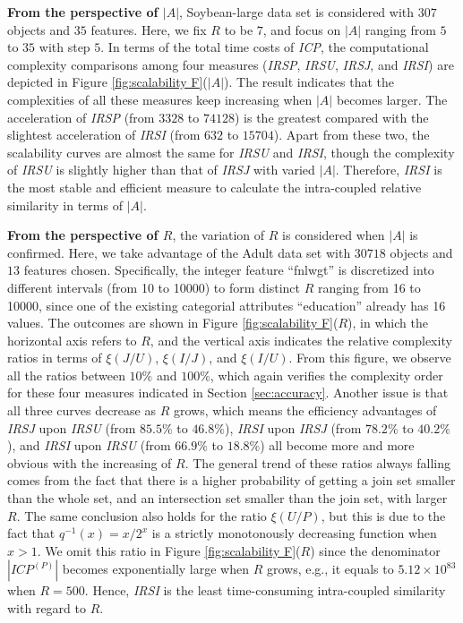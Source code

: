 \documentclass{article}
\numberwithin{equation}{section}
\begin{document}
\textbf{From the perspective of $|A|$}, Soybean-large data set is considered with $307$ objects and $35$ features. Here, we fix $R$ to be $7$, and focus on $|A|$ ranging from $5$ to $35$ with step $5$. In terms of the total time costs of \emph{ICP}, the computational complexity comparisons among four measures (\emph{IRSP}, \emph{IRSU}, \emph{IRSJ}, and \emph{IRSI}) are depicted in Figure \ref{fig:scalability F}($|A|$). The result indicates that the complexities of all these measures keep increasing when $|A|$ becomes larger. The acceleration of \emph{IRSP} (from $3328$ to $74128$) is the greatest compared with the slightest acceleration of \emph{IRSI} (from $632$ to $15704$). Apart from these two, the scalability curves are almost the same for \emph{IRSU} and \emph{IRSI}, though the complexity of \emph{IRSU} is slightly higher than that of \emph{IRSJ} with varied $|A|$. Therefore, \emph{IRSI} is the most stable and efficient measure to calculate the intra-coupled relative similarity in terms of $|A|$.



\textbf{From the perspective of $R$}, the variation of  $R$ is considered when $|A|$ is confirmed. Here, we take advantage of the Adult data set with $30718$ objects and $13$ features chosen. Specifically, the integer feature ``fnlwgt'' is discretized into different intervals (from 10 to 10000) to form distinct $R$ ranging from 16 to 10000, since one of the existing categorial attributes ``education'' already has 16 values. The outcomes are shown in Figure \ref{fig:scalability F}($R$), in which the horizontal axis refers to $R$, and the vertical axis indicates the relative complexity ratios in terms of $\xi(J/U)$, $\xi(I/J)$, and $\xi(I/U)$. From this figure, we observe all the ratios between $10\%$ and $100\%$, which again verifies the complexity order for these four measures indicated in Section \ref{sec:accuracy}. Another issue is that all three curves decrease as $R$ grows, which means the efficiency advantages of  \emph{IRSJ} upon \emph{IRSU} (from $85.5\%$ to $46.8\%$), \emph{IRSI} upon \emph{IRSJ} (from $78.2\%$ to $40.2\%$), and \emph{IRSI} upon \emph{IRSU} (from $66.9\%$ to $18.8\%$) all become more and more obvious with the increasing of $R$. The general trend of these ratios always falling comes from the fact that there is a higher probability of getting a join set smaller than the whole set, and an intersection set smaller than the join set, with larger $R$. The same conclusion also holds for the ratio $\xi(U/P)$, but this is due to the fact that $q^{-1}(x)=x/2^x$ is a strictly monotonously decreasing function when $x>1$. We omit this ratio in Figure \ref{fig:scalability F}($R$) since the denominator $|ICP^{(P)}|$ becomes exponentially  large when $R$ grows, e.g., it equals to $5.12\times 10^{83}$ when $R=500$. Hence, \emph{IRSI} is the least time-consuming intra-coupled similarity with regard to $R$.
\end{document}
